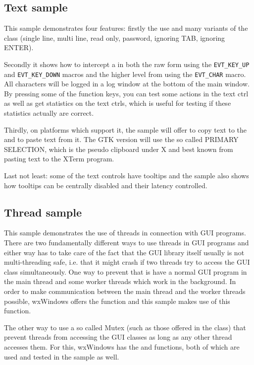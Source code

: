 \subsection{Text sample}\label{sampletext}

This sample demonstrates four features: firstly the use and many variants of
the  class (single line, multi line, read only,
password, ignoring TAB, ignoring ENTER).

Secondly it shows how to intercept a  in both
the raw form using the {\tt EVT\_KEY\_UP} and {\tt EVT\_KEY\_DOWN} macros and the
higher level from using the {\tt EVT\_CHAR} macro. All characters will be logged
in a log window at the bottom of the main window. By pressing some of the function
keys, you can test some actions in the text ctrl as well as get statistics on the
text ctrls, which is useful for testing if these statistics actually are correct.

Thirdly, on platforms which support it, the sample will offer to copy text to the 
 and to paste text from it. The GTK version will
use the so called PRIMARY SELECTION, which is the pseudo clipboard under X and
best known from pasting text to the XTerm program.

Last not least: some of the text controls have tooltips and the sample also shows
how tooltips can be centrally disabled and their latency controlled.

\subsection{Thread sample}\label{samplethread}

This sample demonstrates the use of threads in connection with GUI programs.
There are two fundamentally different ways to use threads in GUI programs and
either way has to take care of the fact that the GUI library itself usually
is not multi-threading safe, i.e. that it might crash if two threads try to
access the GUI class simultaneously. One way to prevent that is have a normal
GUI program in the main thread and some worker threads which work in the 
background. In order to make communication between the main thread and the
worker threads possible, wxWindows offers the  
function and this sample makes use of this function.

The other way to use a so called Mutex (such as those offered in the  
class) that prevent threads from accessing the GUI classes as long as any other
thread accesses them. For this, wxWindows has the  
and  functions, both of which are
used and tested in the sample as well.

